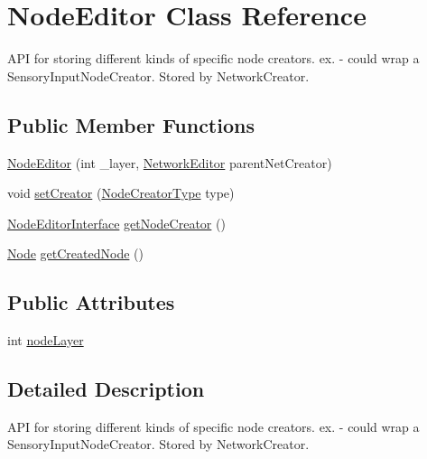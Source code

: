 \hypertarget{class_node_editor}{}\section{Node\+Editor Class Reference}
\label{class_node_editor}


A\+PI for storing different kinds of specific node creators. ex. -\/ could wrap a Sensory\+Input\+Node\+Creator. Stored by Network\+Creator.  


\subsection*{Public Member Functions}
\begin{DoxyCompactItemize}
\item 
\mbox{\hyperlink{class_node_editor_abd0642bacf3934685527b94425770f64}{Node\+Editor}} (int \+\_\+layer, \mbox{\hyperlink{class_network_editor}{Network\+Editor}} parent\+Net\+Creator)
\item 
void \mbox{\hyperlink{class_node_editor_a24174978502582ab68d487d35f38d029}{set\+Creator}} (\mbox{\hyperlink{_node_editor_8cs_afc5d9fc086bcd57827af91c5d369b625}{Node\+Creator\+Type}} type)
\item 
\mbox{\hyperlink{interface_node_editor_interface}{Node\+Editor\+Interface}} \mbox{\hyperlink{class_node_editor_acdd21c090158fa8bbfd636bec7d86309}{get\+Node\+Creator}} ()
\item 
\mbox{\hyperlink{class_node}{Node}} \mbox{\hyperlink{class_node_editor_a42b9d431ac444320d4d628d13868c19f}{get\+Created\+Node}} ()
\end{DoxyCompactItemize}
\subsection*{Public Attributes}
\begin{DoxyCompactItemize}
\item 
int \mbox{\hyperlink{class_node_editor_aebb0d7bfb182de466d69abe21ab21fbb}{node\+Layer}}
\end{DoxyCompactItemize}


\subsection{Detailed Description}
A\+PI for storing different kinds of specific node creators. ex. -\/ could wrap a Sensory\+Input\+Node\+Creator. Stored by Network\+Creator. 




